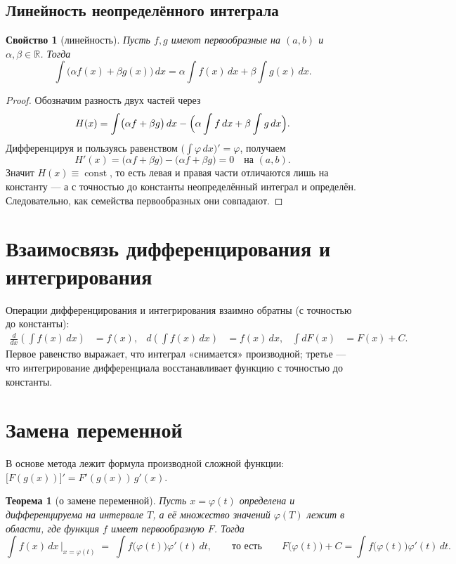 \documentclass[11pt,a4paper]{article}
\theoremstyle{definition}
\theoremstyle{plain}
\newtheorem{theorem}[definition]{Теорема}
\newtheorem{property}[definition]{Свойство}
\DeclareMathOperator{\Const}{const}
\newcommand{\R}{\mathbb{R}}
\newcommand{\dx}{\,dx}
\newcommand{\dt}{\,dt}
\begin{document}
\subsection{Линейность неопределённого интеграла}
\begin{property}[линейность]
Пусть $f,g$ имеют первообразные на $(a,b)$ и $\alpha,\beta\in\R$. Тогда
\[
  \int\bigl(\alpha f(x)+\beta g(x)\bigr)\dx
   =\alpha\int f(x)\dx+\beta\int g(x)\dx .
\]
\end{property}

\begin{proof}
Обозначим разность двух частей через
\[
  H(x)=\int\bigl(\alpha f+\beta g\bigr)\dx-\Bigl(\alpha\int f\dx+\beta\int g\dx\Bigr).
\]
Дифференцируя и пользуясь равенством $\bigl(\int\varphi\dx\bigr)'=\varphi$, получаем
\[
  H'(x)=\bigl(\alpha f+\beta g\bigr)-\bigl(\alpha f+\beta g\bigr)=0
  \quad\text{на }(a,b).
\]
Значит $H(x)\equiv\Const$, то есть левая и правая части отличаются лишь на константу — а с
точностью до константы неопределённый интеграл и определён. Следовательно, как семейства
первообразных они совпадают.
\end{proof}

\section{Взаимосвязь дифференцирования и интегрирования}

Операции дифференцирования и интегрирования взаимно обратны (с точностью до константы):
\begin{align*}
  \frac{d}{dx}\!\left(\int f(x)\dx\right) &= f(x), &
  d\!\left(\int f(x)\dx\right) &= f(x)\dx, &
  \int dF(x) &= F(x)+C.
\end{align*}
Первое равенство выражает, что интеграл «снимается» производной; третье — что интегрирование
дифференциала восстанавливает функцию с точностью до константы.

\section{Замена переменной}

В основе метода лежит формула производной сложной функции:
$\bigl[F(g(x))\bigr]'=F'(g(x))\,g'(x)$.

\begin{theorem}[о замене переменной]
Пусть $x=\varphi(t)$ определена и дифференцируема на интервале $T$, а её множество значений
$\varphi(T)$ лежит в области, где функция $f$ имеет первообразную $F$. Тогда
\[
  \int f(x)\dx\,\Big|_{x=\varphi(t)} \;=\; \int f\bigl(\varphi(t)\bigr)\varphi'(t)\dt,
  \qquad\text{то есть}\qquad
  F\bigl(\varphi(t)\bigr)+C=\int f\bigl(\varphi(t)\bigr)\varphi'(t)\dt .
\]
\end{theorem}
\end{document}
